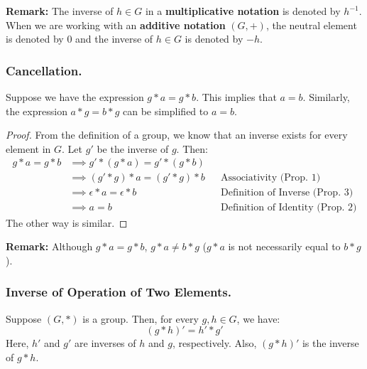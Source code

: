 \documentclass[letterpaper]{article}
\begin{document}
\textbf{Remark:} The inverse of $h \in G$ in a \textbf{multiplicative notation} is denoted by $h^{-1}$. When we are working with an \textbf{additive notation} $(G, +)$, the neutral element is denoted by 0 and the inverse of $h \in G$ is denoted by $-h$.   

\subsubsection{Cancellation.}

Suppose we have the expression $g * a = g * b$. This implies that $a = b$. Similarly, the expression $a * g = b * g$ can be simplified to $a = b$. 

\begin{framed}
    \begin{proof}
        From the definition of a group, we know that an inverse exists for every element in $G$. Let $g'$ be the inverse of $g$. Then:
        \begin{equation*}
            \begin{aligned}
                g * a = g * b &\implies g' * (g * a) = g' * (g * b) \\
                    &\implies (g' * g) * a = (g' * g) * b && \text{Associativity (Prop. 1)} \\
                    &\implies \epsilon * a = \epsilon * b && \text{Definition of Inverse (Prop. 3)} \\  
                    &\implies a = b && \text{Definition of Identity (Prop. 2)}
            \end{aligned}
        \end{equation*}
        The other way is similar. 
    \end{proof}
\end{framed}

\textbf{Remark:} Although $g * a = g * b$, $g * a \neq b * g$ ($g * a$ is not necessarily equal to $b * g$). 

\subsubsection{Inverse of Operation of Two Elements.}

\begin{lemma}{}{}
    Suppose $(G, *)$ is a group. Then, for every $g, h \in G$, we have: 
    \[(g * h)' = h' * g'\]
    Here, $h'$ and $g'$ are inverses of $h$ and $g$, respectively. Also, $(g * h)'$ is the inverse of $g * h$.  
\end{lemma}
\end{document}
